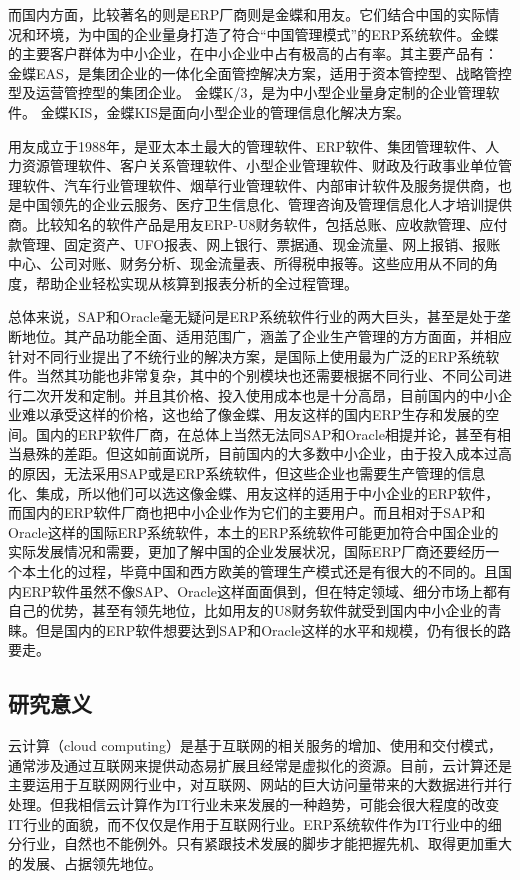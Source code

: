 \documentclass{Proposal}
\begin{document}
而国内方面，比较著名的则是ERP厂商则是金蝶和用友。它们结合中国的实际情况和环境，为中国的企业量身打造了符合“中国管理模式”的ERP系统软件。金蝶的主要客户群体为中小企业，在中小企业中占有极高的占有率。其主要产品有：
金蝶EAS，是集团企业的一体化全面管控解决方案，适用于资本管控型、战略管控型及运营管控型的集团企业。
金蝶K/3，是为中小型企业量身定制的企业管理软件。
金蝶KIS，金蝶KIS是面向小型企业的管理信息化解决方案。

用友成立于1988年，是亚太本土最大的管理软件、ERP软件、集团管理软件、人力资源管理软件、客户关系管理软件、小型企业管理软件、财政及行政事业单位管理软件、汽车行业管理软件、烟草行业管理软件、内部审计软件及服务提供商，也是中国领先的企业云服务、医疗卫生信息化、管理咨询及管理信息化人才培训提供商。比较知名的软件产品是用友ERP-U8财务软件，包括总账、应收款管理、应付款管理、固定资产、UFO报表、网上银行、票据通、现金流量、网上报销、报账中心、公司对账、财务分析、现金流量表、所得税申报等。这些应用从不同的角度，帮助企业轻松实现从核算到报表分析的全过程管理。

总体来说，SAP和Oracle毫无疑问是ERP系统软件行业的两大巨头，甚至是处于垄断地位。其产品功能全面、适用范围广，涵盖了企业生产管理的方方面面，并相应针对不同行业提出了不统行业的解决方案，是国际上使用最为广泛的ERP系统软件。当然其功能也非常复杂，其中的个别模块也还需要根据不同行业、不同公司进行二次开发和定制。并且其价格、投入使用成本也是十分高昂，目前国内的中小企业难以承受这样的价格，这也给了像金蝶、用友这样的国内ERP生存和发展的空间。国内的ERP软件厂商，在总体上当然无法同SAP和Oracle相提并论，甚至有相当悬殊的差距。但这如前面说所，目前国内的大多数中小企业，由于投入成本过高的原因，无法采用SAP或是ERP系统软件，但这些企业也需要生产管理的信息化、集成，所以他们可以选这像金蝶、用友这样的适用于中小企业的ERP软件，而国内的ERP软件厂商也把中小企业作为它们的主要用户。而且相对于SAP和Oracle这样的国际ERP系统软件，本土的ERP系统软件可能更加符合中国企业的实际发展情况和需要，更加了解中国的企业发展状况，国际ERP厂商还要经历一个本土化的过程，毕竟中国和西方欧美的管理生产模式还是有很大的不同的。且国内ERP软件虽然不像SAP、Oracle这样面面俱到，但在特定领域、细分市场上都有自己的优势，甚至有领先地位，比如用友的U8财务软件就受到国内中小企业的青睐。但是国内的ERP软件想要达到SAP和Oracle这样的水平和规模，仍有很长的路要走。

\subsection{研究意义}

云计算（cloud computing）是基于互联网的相关服务的增加、使用和交付模式，通常涉及通过互联网来提供动态易扩展且经常是虚拟化的资源。目前，云计算还是主要运用于互联网网行业中，对互联网、网站的巨大访问量带来的大数据进行并行处理。但我相信云计算作为IT行业未来发展的一种趋势，可能会很大程度的改变IT行业的面貌，而不仅仅是作用于互联网行业。ERP系统软件作为IT行业中的细分行业，自然也不能例外。只有紧跟技术发展的脚步才能把握先机、取得更加重大的发展、占据领先地位。
\end{document}
